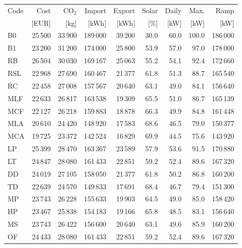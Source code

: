 \clearpage
\noindent\begin{minipage}{\textwidth}\singlespacing\captionsetup{font=footnotesize}
\setlength{\tabcolsep}{4pt}
\renewcommand{\arraystretch}{1.0}
\label{tab:full-scorecard-4-0}
\fontsize{8}{9}\selectfont
\begin{tabular*}{\textwidth}{@{\extracolsep{\fill}}lrrrrrrrr@{}}
\toprule
Code & Cost & CO$_2$ & Import & Export & Solar & Daily & Max. & Ramp\\
 & [EUR] & [kg] & [kWh] & [kWh] & [\%] & [kW] & [kW] & [kW]\\
\midrule
B0 & 25\,500 & 33\,900 & 189\,000 & 39\,200 & 30.0 & 60.0 & 100.0 & 186\,000\\
B1 & 23\,200 & 31\,200 & 174\,000 & 25\,800 & 53.9 & 57.0 & 97.0 & 178\,000\\
RB & 26\,504 & 30\,030 & 169\,167 & 25\,063 & 55.2 & 54.1 & 92.4 & 172\,660\\
RSL & 22\,968 & 27\,690 & 160\,467 & 21\,377 & 61.8 & 51.3 & 88.7 & 165\,540\\
RC & 22\,458 & 27\,008 & 157\,567 & 20\,640 & 63.1 & 49.0 & 84.1 & 156\,640\\
MLF & 22\,633 & 26\,817 & 163\,538 & 19\,309 & 65.5 & 51.0 & 86.7 & 165\,139\\
MCF & 22\,127 & 26\,218 & 159\,883 & 18\,878 & 66.3 & 49.9 & 84.8 & 161\,448\\
MLA & 20\,610 & 24\,420 & 148\,920 & 17\,583 & 68.6 & 46.5 & 79.0 & 150\,377\\
MCA & 19\,725 & 23\,372 & 142\,524 & 16\,829 & 69.9 & 44.5 & 75.6 & 143\,920\\
LP & 25\,399 & 28\,470 & 163\,367 & 23\,589 & 57.9 & 53.6 & 91.5 & 170\,880\\
LT & 24\,847 & 28\,080 & 161\,433 & 22\,851 & 59.2 & 52.4 & 89.6 & 167\,320\\
DD & 24\,019 & 27\,105 & 158\,050 & 21\,377 & 61.8 & 50.2 & 86.8 & 160\,200\\
TD & 22\,639 & 24\,570 & 149\,833 & 17\,691 & 68.4 & 46.7 & 79.4 & 151\,300\\
MP & 23\,743 & 26\,228 & 155\,633 & 19\,903 & 64.5 & 49.0 & 85.0 & 158\,420\\
HP & 23\,467 & 25\,838 & 154\,183 & 19\,166 & 65.8 & 48.5 & 83.1 & 156\,640\\
MS & 23\,743 & 26\,422 & 156\,600 & 20\,640 & 63.1 & 49.6 & 85.9 & 160\,200\\
OF & 24\,433 & 28\,080 & 161\,433 & 22\,851 & 59.2 & 52.4 & 89.6 & 167\,320\\

\end{tabular*}
\end{minipage}
